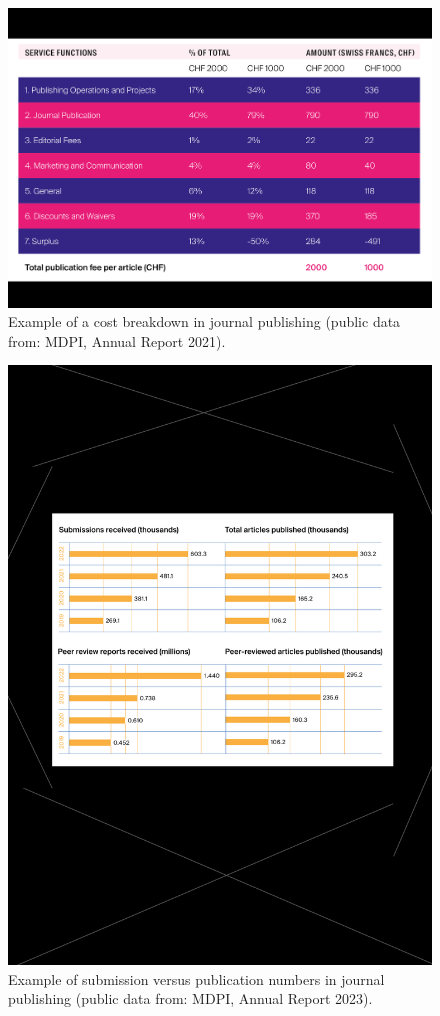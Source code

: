 \documentclass{article}
\begin{document}
\begin{figure}[htb]
    \centering
    \caption{Example of a cost breakdown in journal publishing (public data from: MDPI, Annual Report 2021).}
    \label{fig:mdpiFinancials2021}
    \includegraphics[width=0.75\linewidth]{figures/2021_mdpi_financials.pdf}
\end{figure}

\begin{figure}[htb]
    \centering
    \caption{Example of submission versus publication numbers in journal publishing (public data from: MDPI, Annual Report 2023).}
    \label{fig:mdpiSubmissions2022}
    \includegraphics[width=0.75\linewidth]{figures/2022_mdpi_submissions.pdf}
\end{figure}
\end{document}
